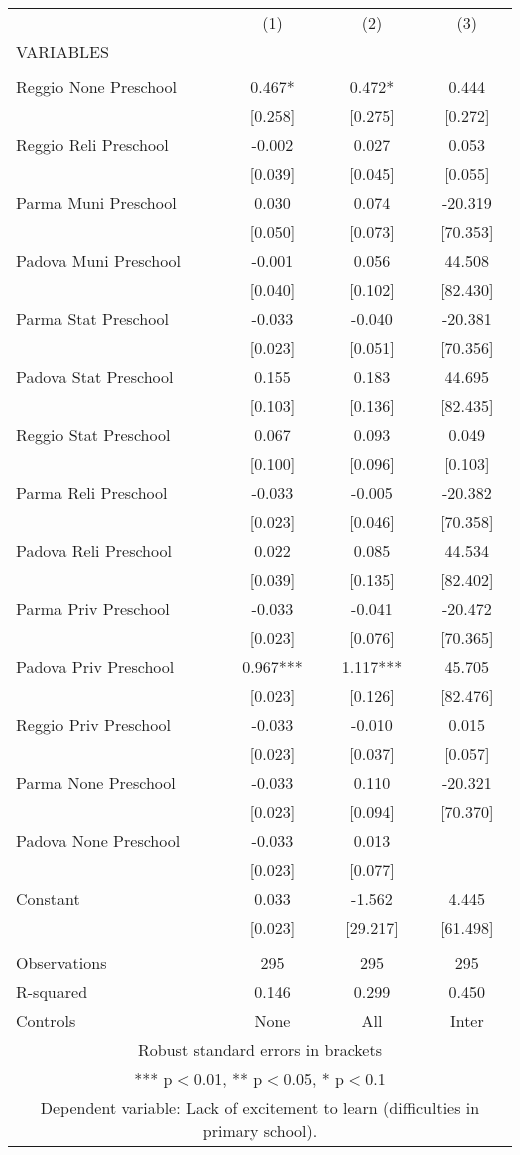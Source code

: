 \begin{tabular}{lccc} \hline
 & (1) & (2) & (3) \\
VARIABLES &  &  &  \\ \hline
 &  &  &  \\
Reggio None Preschool & 0.467* & 0.472* & 0.444 \\
 & [0.258] & [0.275] & [0.272] \\
Reggio Reli Preschool & -0.002 & 0.027 & 0.053 \\
 & [0.039] & [0.045] & [0.055] \\
Parma Muni Preschool & 0.030 & 0.074 & -20.319 \\
 & [0.050] & [0.073] & [70.353] \\
Padova Muni Preschool & -0.001 & 0.056 & 44.508 \\
 & [0.040] & [0.102] & [82.430] \\
Parma Stat Preschool & -0.033 & -0.040 & -20.381 \\
 & [0.023] & [0.051] & [70.356] \\
Padova Stat Preschool & 0.155 & 0.183 & 44.695 \\
 & [0.103] & [0.136] & [82.435] \\
Reggio Stat Preschool & 0.067 & 0.093 & 0.049 \\
 & [0.100] & [0.096] & [0.103] \\
Parma Reli Preschool & -0.033 & -0.005 & -20.382 \\
 & [0.023] & [0.046] & [70.358] \\
Padova Reli Preschool & 0.022 & 0.085 & 44.534 \\
 & [0.039] & [0.135] & [82.402] \\
Parma Priv Preschool & -0.033 & -0.041 & -20.472 \\
 & [0.023] & [0.076] & [70.365] \\
Padova Priv Preschool & 0.967*** & 1.117*** & 45.705 \\
 & [0.023] & [0.126] & [82.476] \\
Reggio Priv Preschool & -0.033 & -0.010 & 0.015 \\
 & [0.023] & [0.037] & [0.057] \\
Parma None Preschool & -0.033 & 0.110 & -20.321 \\
 & [0.023] & [0.094] & [70.370] \\
Padova None Preschool & -0.033 & 0.013 &  \\
 & [0.023] & [0.077] &  \\
Constant & 0.033 & -1.562 & 4.445 \\
 & [0.023] & [29.217] & [61.498] \\
 &  &  &  \\
Observations & 295 & 295 & 295 \\
R-squared & 0.146 & 0.299 & 0.450 \\
 Controls & None & All & Inter \\ \hline
\multicolumn{4}{c}{ Robust standard errors in brackets} \\
\multicolumn{4}{c}{ *** p$<$0.01, ** p$<$0.05, * p$<$0.1} \\
\multicolumn{4}{c}{ Dependent variable: Lack of excitement to learn (difficulties in primary school).} \\
\end{tabular}

